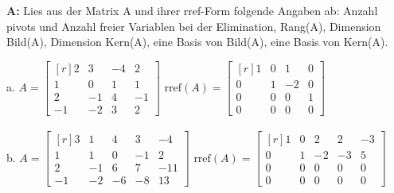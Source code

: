 \documentclass[landscape,twocolumn,a4paper]{article}
\begin{document}
\textbf{A:}   
Lies aus der Matrix A und ihrer rref-Form folgende Angaben ab: Anzahl pivots und Anzahl freier Variablen bei der Elimination, 
Rang(A), Dimension  Bild(A), Dimension Kern(A), eine Basis von Bild(A), eine Basis von Kern(A).

a.   $A =\begin{bmatrix*}[r] 2 & 3 & -4 & 2\\  1 & 0 & 1 & 1\\ 2 & -1 & 4 & -1\\ -1 & -2 & 3 & 2\end{bmatrix*}$  \quad 
      $\text{rref}(A) =\begin{bmatrix*}[r] 1 & 0 & 1 & 0\\  0 & 1 & -2 & 0\\ 0 & 0 & 0 & 1\\ 0 & 0 & 0 & 0\end{bmatrix*}$ 
\\  
\.
\\   
b.   $A =\begin{bmatrix*}[r] 3 & 1 & 4 & 3 & -4\\  1 & 1 & 0 & -1 & 2\\ 2 & -1 & 6 & 7 & -11\\ -1 & -2 & -6 & -8 & 13\end{bmatrix*}$  \quad 
      $\text{rref}(A) =\begin{bmatrix*}[r] 1 & 0 & 2 & 2 & -3\\  0 & 1 & -2 & -3 & 5\\ 0 & 0 & 0 & 0 & 0\\ 0 & 0 & 0 & 0 & 0\end{bmatrix*}$ 
\bigskip {}
\end{document}
